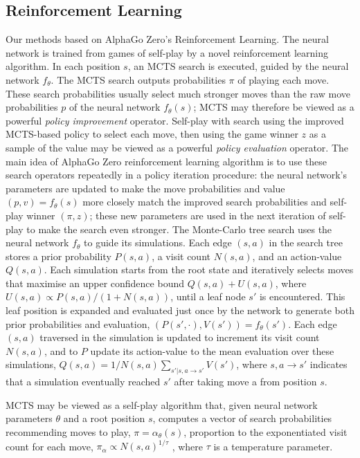 \documentclass[12pt,a4paper]{article}
\begin{document}
\subsection{Reinforcement Learning}
\hspace{0.6cm}Our methods based on AlphaGo Zero's Reinforcement Learning. The neural network is trained from games of self-play by a novel reinforcement learning algorithm. In each position \(s\), an MCTS search is executed, guided by the neural network \(f_\theta\). The MCTS search outputs probabilities \(\pi\) of playing each move. These search probabilities usually select much stronger moves than the raw move probabilities \(p\) of the neural network \(f_\theta(s)\); MCTS may therefore be viewed as a powerful \textit{policy improvement} operator\cite{Howard}. Self-play with search using the improved MCTS-based policy to select each move, then using the game winner \(z\) as a sample of the value may be viewed as a powerful \textit{policy evaluation} operator. The main idea of AlphaGo Zero reinforcement learning algorithm is to use these search operators repeatedly in a policy iteration procedure: the neural network’s parameters are updated to make the move probabilities and value \((p, v) = f_\theta(s)\) more closely match the improved search probabilities and self-play winner \((\pi, z)\); these new parameters are used in the next iteration of self-play to make the search even stronger. The Monte-Carlo tree search uses the neural network \(f_\theta\) to guide its simulations. Each edge \((s, a)\) in the search tree stores a prior probability \(P(s, a)\), a visit count \(N(s, a)\), and an action-value \(Q(s, a)\). Each simulation starts from the root state and iteratively selects moves that maximise an upper confidence bound \(Q(s, a) + U(s, a)\), where \(U(s, a) \propto P(s, a)/(1 + N(s, a))\)\cite{AlphaGo}, until a leaf node \(s'\) is encountered. This leaf position is expanded and evaluated just once by the network to generate both prior probabilities and evaluation, \((P(s', ·), V(s')) = f_θ (s')\). Each edge \((s, a)\) traversed in the simulation is updated to increment its visit count \(N(s, a)\), and to \(P\) update its action-value to the mean evaluation over these simulations, \(Q(s, a) = 1/N(s, a) \sum_{s'|s,a\to s'}V(s')\), where \(s,a\to s'\) indicates that a simulation eventually reached \(s'\) after taking move a from position \(s\).\par
MCTS may be viewed as a self-play algorithm that, given neural network parameters \(\theta\) and a root position \(s\), computes a vector of search probabilities recommending moves to play, \(\pi = \alpha_\theta(s)\), proportion to the exponentiated visit count for each move, \(\pi_\alpha \propto N(s, a)^{1/\tau}\) , where \(\tau\) is a temperature parameter.\par
\end{document}
